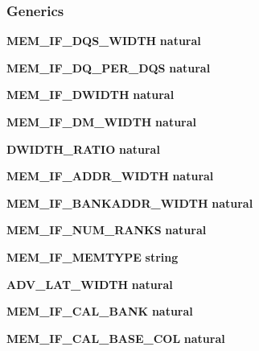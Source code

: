 \subsubsection*{Generics}
 \begin{DoxyCompactItemize}
\item 
{\bf M\+E\+M\+\_\+\+I\+F\+\_\+\+D\+Q\+S\+\_\+\+W\+I\+D\+TH} {\bfseries {\bfseries \textcolor{comment}{natural}\textcolor{vhdlchar}{ }}}
\item 
{\bf M\+E\+M\+\_\+\+I\+F\+\_\+\+D\+Q\+\_\+\+P\+E\+R\+\_\+\+D\+QS} {\bfseries {\bfseries \textcolor{comment}{natural}\textcolor{vhdlchar}{ }}}
\item 
{\bf M\+E\+M\+\_\+\+I\+F\+\_\+\+D\+W\+I\+D\+TH} {\bfseries {\bfseries \textcolor{comment}{natural}\textcolor{vhdlchar}{ }}}
\item 
{\bf M\+E\+M\+\_\+\+I\+F\+\_\+\+D\+M\+\_\+\+W\+I\+D\+TH} {\bfseries {\bfseries \textcolor{comment}{natural}\textcolor{vhdlchar}{ }}}
\item 
{\bf D\+W\+I\+D\+T\+H\+\_\+\+R\+A\+T\+IO} {\bfseries {\bfseries \textcolor{comment}{natural}\textcolor{vhdlchar}{ }}}
\item 
{\bf M\+E\+M\+\_\+\+I\+F\+\_\+\+A\+D\+D\+R\+\_\+\+W\+I\+D\+TH} {\bfseries {\bfseries \textcolor{comment}{natural}\textcolor{vhdlchar}{ }}}
\item 
{\bf M\+E\+M\+\_\+\+I\+F\+\_\+\+B\+A\+N\+K\+A\+D\+D\+R\+\_\+\+W\+I\+D\+TH} {\bfseries {\bfseries \textcolor{comment}{natural}\textcolor{vhdlchar}{ }}}
\item 
{\bf M\+E\+M\+\_\+\+I\+F\+\_\+\+N\+U\+M\+\_\+\+R\+A\+N\+KS} {\bfseries {\bfseries \textcolor{comment}{natural}\textcolor{vhdlchar}{ }}}
\item 
{\bf M\+E\+M\+\_\+\+I\+F\+\_\+\+M\+E\+M\+T\+Y\+PE} {\bfseries {\bfseries \textcolor{comment}{string}\textcolor{vhdlchar}{ }}}
\item 
{\bf A\+D\+V\+\_\+\+L\+A\+T\+\_\+\+W\+I\+D\+TH} {\bfseries {\bfseries \textcolor{comment}{natural}\textcolor{vhdlchar}{ }}}
\item 
{\bf M\+E\+M\+\_\+\+I\+F\+\_\+\+C\+A\+L\+\_\+\+B\+A\+NK} {\bfseries {\bfseries \textcolor{comment}{natural}\textcolor{vhdlchar}{ }}}
\item 
{\bf M\+E\+M\+\_\+\+I\+F\+\_\+\+C\+A\+L\+\_\+\+B\+A\+S\+E\+\_\+\+C\+OL} {\bfseries {\bfseries \textcolor{comment}{natural}\textcolor{vhdlchar}{ }}}
\end{DoxyCompactItemize}
